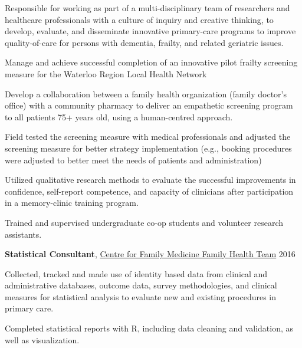 \documentclass[10pt]{article}
\newenvironment{innerlist}[1][\enskip\textbullet]%
        {\begin{compactenum}[#1]}{\end{compactenum}}
\providecommand{\tightlist}{%
  \setlength{\itemsep}{0pt}\setlength{\parskip}{0pt}}
\begin{document}
\begin{outerlist}
 \begin{innerlist}
  \tightlist
  \item
    Responsible for working as part of a multi-disciplinary team of
    researchers and healthcare professionals with a culture of inquiry
    and creative thinking, to develop, evaluate, and disseminate
    innovative primary-care programs to improve quality-of-care for
    persons with dementia, frailty, and related geriatric issues.
  \item
    Manage and achieve successful completion of an innovative pilot
    frailty screening measure for the Waterloo Region Local Health
    Network
  \item
    Develop a collaboration between a family health organization (family
    doctor's office) with a community pharmacy to deliver an empathetic
    screening program to all patients 75+ years old, using a
    human-centred approach.
  \item
    Field tested the screening measure with medical professionals and
    adjusted the screening measure for better strategy implementation
    (e.g., booking procedures were adjusted to better meet the needs of
    patients and administration)
  \item
    Utilized qualitative research methods to evaluate the successful
    improvements in confidence, self-report competence, and capacity of
    clinicians after participation in a memory-clinic training program.

   \begin{innerlist}
    \tightlist
    \item
      Trained and supervised undergraduate co-op students and volunteer
      research assistants.
   \end{innerlist}
 \end{innerlist}
\item
  \textbf{Statistical Consultant},
  \href{https://family-medicine.ca/}{Centre for Family Medicine Family
  Health Team} \hfill 2016

 \begin{innerlist}
  \tightlist
  \item
    Collected, tracked and made use of identity based data from clinical
    and administrative databases, outcome data, survey methodologies,
    and clinical measures for statistical analysis to evaluate new and
    existing procedures in primary care.
  \item
    Completed statistical reports with R, including data cleaning and
    validation, as well as visualization.
 \end{innerlist}
\end{outerlist}
\end{document}
